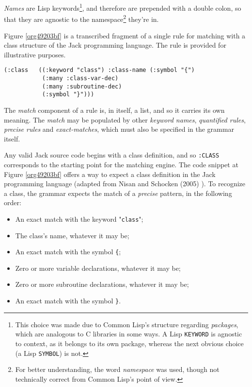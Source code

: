 \documentclass[a4paper,11pt,oneside]{article}
\begin{document}
\emph{Names} are Lisp keywords\footnote{This choice was made due to Common Lisp's structure regarding
\emph{packages}, which are analogous to C libraries in some ways. A Lisp
\texttt{KEYWORD} is agnostic to context, as it belongs to its own package,
whereas the next obvious choice (a Lisp \texttt{SYMBOL}) is not.}, and therefore are prepended with a
double colon, so that they are agnostic to the namespace\footnote{For better understanding, the word \emph{namespace} was used, though
not technically correct from Common Lisp's point of view.} they're
in.

Figure \ref{org49203bf} is a transcribed fragment of a single rule
for matching with a class structure of the Jack programming
language. The rule is provided for illustrative purposes.

\begin{verbatim}
(:class   ((:keyword "class") :class-name (:symbol "{")
           (:many :class-var-dec)
           (:many :subroutine-dec)
           (:symbol "}")))
\end{verbatim}
\hfill \break

The \emph{match} component of a rule is, in itself, a list, and so it carries
its own meaning. The \emph{match} may be populated by other \emph{keyword names},
\emph{quantified rules}, \emph{precise rules} and \emph{exact-matches}, which must also be
specified in the grammar itself.

Any valid Jack source code begins with a class definition, and so
\texttt{:CLASS} corresponds to the starting point for the matching engine. The
code snippet at Figure \ref{org49203bf} offers a way to expect a class
definition in the Jack programming language (adapted from Nisan and
Schocken (2005) \cite{nand2tetris}). To recognize a class, the grammar
expects the match of a \emph{precise} pattern, in the following order:

\begin{itemize}
\item An exact match with the keyword "\texttt{class}";
\item The class's name, whatever it may be;
\item An exact match with the symbol \texttt{\{};
\item Zero or more variable declarations, whatever it may be;
\item Zero or more subroutine declarations, whatever it may be;
\item An exact match with the symbol \texttt{\}}.
\end{itemize}
\end{document}
